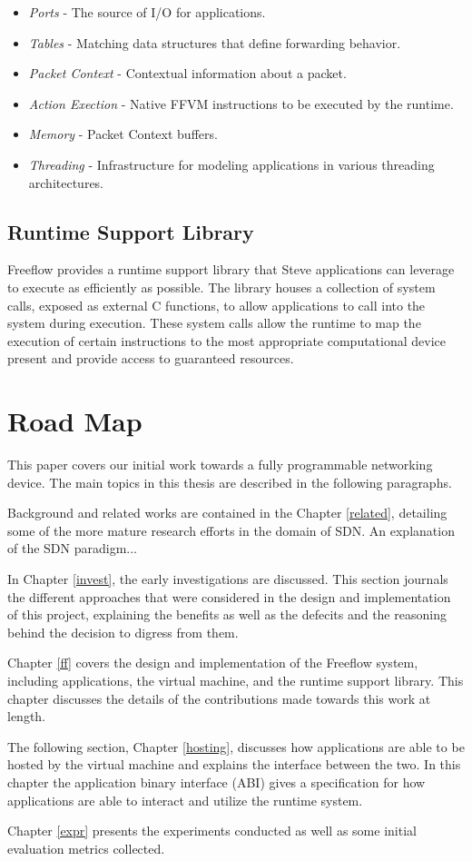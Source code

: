 \begin{itemize}
\item \emph{Ports} - The source of I/O for applications.
\item \emph{Tables} - Matching data structures that define forwarding behavior.
\item \emph{Packet Context} - Contextual information about a packet.
\item \emph{Action Exection} - Native FFVM instructions to be executed by the
runtime.
\item \emph{Memory} - Packet Context buffers.
\item \emph{Threading} - Infrastructure for modeling applications in various
threading architectures.
\end{itemize}

\subsection{Runtime Support Library}
Freeflow provides a runtime support library that Steve applications can
leverage to execute as efficiently as possible. The library houses a collection
of system calls, exposed as external C functions, to allow applications to call
into the system during execution. These system calls allow the runtime to map
the execution of certain instructions to the most appropriate computational
device present and provide access to guaranteed resources.

\section{Road Map}
This paper covers our initial work towards a fully programmable networking
device. The main topics in this thesis are described in the following paragraphs.

Background and related works are contained in the Chapter \ref{related},
detailing some of the more mature research efforts in the domain of SDN. An
explanation of the SDN paradigm...

In Chapter \ref{invest}, the early investigations are discussed. This section
journals the different approaches that were considered in the design and
implementation of this project, explaining the benefits as well as the defecits
and the reasoning behind the decision to digress from them.

Chapter \ref{ff} covers the design and implementation of the Freeflow system,
including applications, the virtual machine, and the runtime support library.
This chapter discusses the details of the contributions made towards this work
at length.

The following section, Chapter \ref{hosting}, discusses how applications are
able to be hosted by the virtual machine and explains the interface between the
two. In this chapter the application binary interface (ABI) gives a specification
for how applications are able to interact and utilize the runtime system.

Chapter \ref{expr} presents the experiments conducted as well as some initial
evaluation metrics collected.
